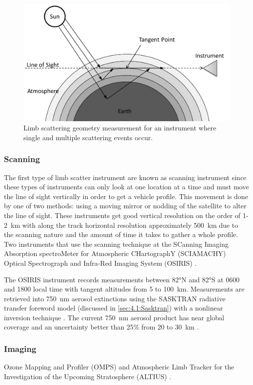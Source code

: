 \begin{figure}
    \includegraphics[width=1.0\textwidth]{./Images/2-2-LimbScatterGeometry.pdf}
    \caption[Limb Scatter Geometry]{Limb scattering geometry measurement for an instrument where single and multiple scattering events occur.}
    \label{fig:2.2:LimbScatterGeometry}
\end{figure}

\subsubsection{Scanning}

The first type of limb scatter instrument are known as scanning instrument since these types of instruments can only look at one location at a time and must move the line of sight vertically in order to get a vehicle profile. This movement is done by one of two methods: using a moving mirror or nodding of the satellite to alter the line of sight. These instruments get good vertical resolution on the order of 1-2~km with along the track horizontal resolution approximately 500~km due to the scanning nature and the amount of time it takes to gather a whole profile. Two instruments that use the scanning technique at the SCanning Imaging Absorption spectroMeter for Atmospheric CHartographY (SCIAMACHY) \citep{Bovensmann1999} Optical Spectrograph and Infra-Red Imaging System (OSIRIS) \citep{Llewellyn2004}.

The OSIRIS instrument records measurements between 82\si{\degree}N and 82\si{\degree}S at 0600 and 1800 local time with tangent altitudes from 5 to 100~km. Measurements are retrieved into 750~nm aerosol extinctions using the SASKTRAN radiative transfer foreword model (discussed in \autoref{sec:4.1:Sasktran}) with a nonlinear inversion technique \citep{Bourassa2007}. The current 750~nm aerosol product has near global coverage and an uncertainty better than 25\% from 20 to 30~km \citep{Bourassa2012a,Bourassa2012b}.

\subsubsection{Imaging}

Ozone Mapping and Profiler (OMPS) \citep{Dittman2002} and Atmospheric Limb Tracker for the Investigation of the Upcoming Stratosphere (ALTIUS) \citep{Dekemper2014}. 